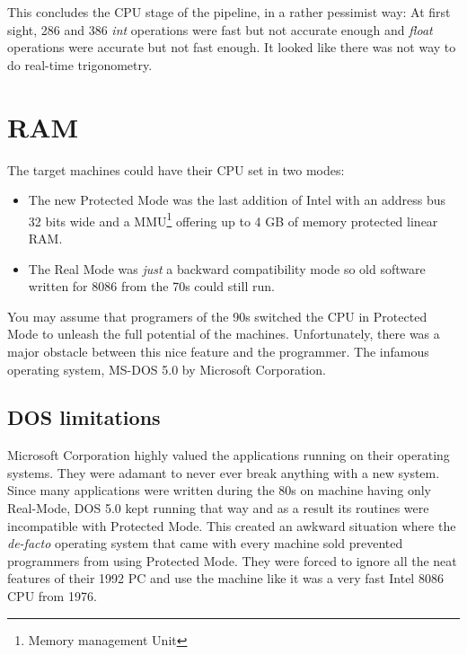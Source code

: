 \documentclass[book.tex]{subfiles}
\begin{document}
\bigskip
This concludes the CPU stage of the pipeline, in a rather pessimist way: At first sight, 286 and 386 \emph{int} operations were fast but not accurate enough and \emph{float} operations were accurate but not fast enough. It looked like there was not way to do real-time trigonometry.

   















\section{RAM}
The target machines could have their CPU set in two modes:
\begin{itemize}
  \item The new Protected Mode was the last addition of Intel with an address bus 32 bits wide and a MMU\footnote{Memory management Unit} offering up to 4 GB of memory protected linear RAM.
  \item The Real Mode was \emph{just} a backward compatibility mode so old software written for 8086 from the 70s could still run. 
\end{itemize}
  You may assume that programers of the 90s switched the CPU in Protected Mode to unleash the full potential of the machines. Unfortunately, there was a major obstacle between this nice feature and the programmer. The infamous operating system, MS-DOS 5.0 by Microsoft Corporation.
  






  \subsection{DOS limitations}
  Microsoft Corporation highly valued the applications running on their operating systems. They were adamant to never ever break anything with a new system.  Since many applications were written during the 80s on machine having only Real-Mode, DOS 5.0 kept running that way and as a result its routines were incompatible with Protected Mode. This created an awkward situation where the \emph{de-facto} operating system that came with every machine sold prevented programmers from using Protected Mode. They were forced to ignore all the neat features of their 1992 PC and use the machine like it was a very fast Intel 8086 CPU from 1976.
\end{document}
